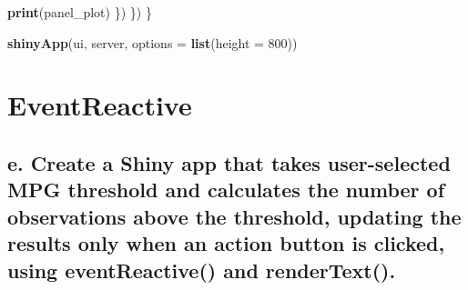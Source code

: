 \documentclass[
]{book}
\newenvironment{Shaded}{\begin{snugshade}}{\end{snugshade}}
\newcommand{\AttributeTok}[1]{\textcolor[rgb]{0.13,0.29,0.53}{#1}}
\newcommand{\DecValTok}[1]{\textcolor[rgb]{0.00,0.00,0.81}{#1}}
\newcommand{\FunctionTok}[1]{\textcolor[rgb]{0.13,0.29,0.53}{\textbf{#1}}}
\newcommand{\NormalTok}[1]{#1}
\begin{document}
\begin{Shaded}
\begin{Highlighting}[]
      \FunctionTok{print}\NormalTok{(panel\_plot)}
\NormalTok{    \})}
\NormalTok{  \})}
\NormalTok{\}}

\FunctionTok{shinyApp}\NormalTok{(ui, server, }\AttributeTok{options =} \FunctionTok{list}\NormalTok{(}\AttributeTok{height =} \DecValTok{800}\NormalTok{))}
\end{Highlighting}
\end{Shaded}

\hypertarget{eventreactive}{%
\section{EventReactive}\label{eventreactive}}

\hypertarget{e.-create-a-shiny-app-that-takes-user-selected-mpg-threshold-and-calculates-the-number-of-observations-above-the-threshold-updating-the-results-only-when-an-action-button-is-clicked-using-eventreactive-and-rendertext.}{%
\subsection{e. Create a Shiny app that takes user-selected MPG threshold and calculates the number of observations above the threshold, updating the results only when an action button is clicked, using eventReactive() and renderText().}\label{e.-create-a-shiny-app-that-takes-user-selected-mpg-threshold-and-calculates-the-number-of-observations-above-the-threshold-updating-the-results-only-when-an-action-button-is-clicked-using-eventreactive-and-rendertext.}}
\end{document}
